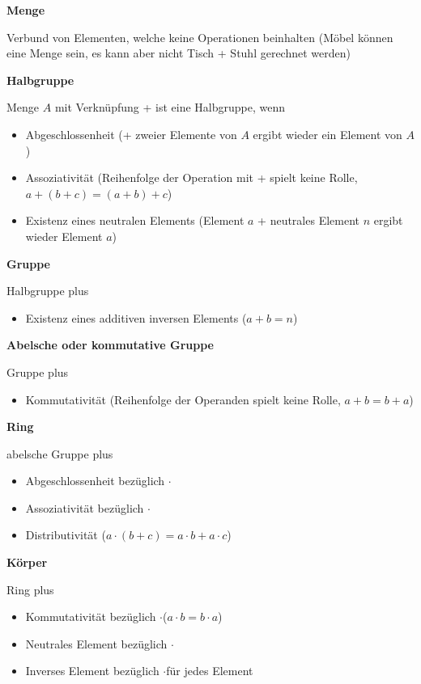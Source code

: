 \textbf{Menge}

Verbund von Elementen, welche keine Operationen beinhalten (Möbel können eine Menge sein, es kann aber nicht Tisch + Stuhl gerechnet werden)

\textbf{Halbgruppe}

Menge $A$ mit Verknüpfung \frqq +\flqq{} ist eine Halbgruppe, wenn
\begin{itemize}
    \item Abgeschlossenheit (+ zweier Elemente von $A$ ergibt wieder ein Element von $A$)
    \item Assoziativität (Reihenfolge der Operation mit + spielt keine Rolle, $a + (b + c) = (a + b) + c$)
    \item Existenz eines neutralen Elements (Element $a$ + neutrales Element $n$ ergibt wieder Element $a$)
\end{itemize}

\textbf{Gruppe}

Halbgruppe plus
\begin{itemize}
    \item Existenz eines additiven inversen Elements ($a + b = n$)
\end{itemize}

\textbf{Abelsche oder kommutative Gruppe}

Gruppe plus
\begin{itemize}
    \item Kommutativität (Reihenfolge der Operanden spielt keine Rolle, $a + b = b + a$)
\end{itemize}

\textbf{Ring}

abelsche Gruppe plus
\begin{itemize}
    \item Abgeschlossenheit bezüglich \frqq $\cdot$\flqq
    \item Assoziativität bezüglich \frqq $\cdot$\flqq
    \item Distributivität ($a \cdot (b + c) = a \cdot b + a \cdot c$)
\end{itemize}

\textbf{Körper}

Ring plus
\begin{itemize}
    \item Kommutativität bezüglich \frqq $\cdot$\flqq ($a \cdot b = b \cdot a$)
    \item Neutrales Element bezüglich \frqq $\cdot$\flqq
    \item Inverses Element bezüglich \frqq $\cdot$\flqq für jedes Element
\end{itemize}

